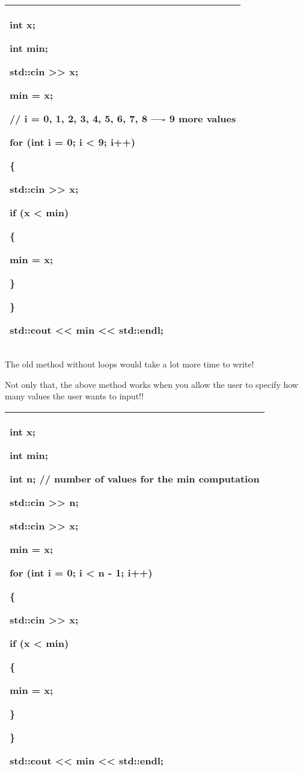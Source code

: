 \documentclass[
]{article}
\begin{document}
\begin{longtable}[]{@{}l@{}}
\toprule
\endhead
\begin{minipage}[t]{0.97\columnwidth}\raggedright
int x;

int min;

std::cin \textgreater\textgreater{} x;

min = x;

// i = 0, 1, 2, 3, 4, 5, 6, 7, 8 ---\/- 9 more values

for (int i = 0; i \textless{} 9; i++)

\{

std::cin \textgreater\textgreater{} x;

if (x \textless{} min)

\{

min = x;

\}

\}

std::cout \textless\textless{} min \textless\textless{} std::endl;\strut
\end{minipage}\tabularnewline
\bottomrule
\end{longtable}

The old method without loops would take a lot more time to write!

Not only that, the above method works when you allow the user to specify
how many values the user wants to input!!

\begin{longtable}[]{@{}l@{}}
\toprule
\endhead
\begin{minipage}[t]{0.97\columnwidth}\raggedright
int x;

int min;

int n; // number of values for the min computation

std::cin \textgreater\textgreater{} n;

std::cin \textgreater\textgreater{} x;

min = x;

for (int i = 0; i \textless{} n - 1; i++)

\{

std::cin \textgreater\textgreater{} x;

if (x \textless{} min)

\{

min = x;

\}

\}

std::cout \textless\textless{} min \textless\textless{} std::endl;\strut
\end{minipage}\tabularnewline
\bottomrule
\end{longtable}
\end{document}
